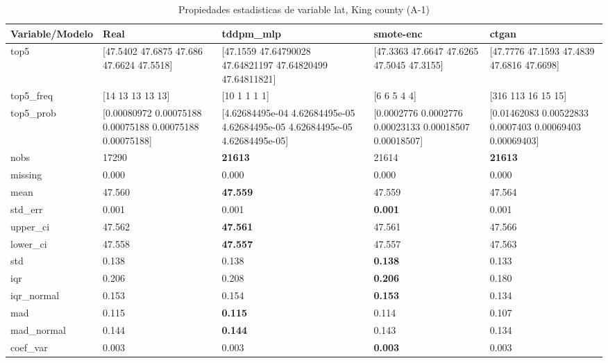 \begin{table}[H]
\centering
\fontsize{8}{14}\selectfont
\caption{Propiedades  estadisticas de variable lat, King county (A-1)}
\label{table-stats-king county-a-1-lat}
\begin{tabular}{|l|m{10em}|m{10em}|m{10em}|m{10em}|}
\hline
 \rowcolor[gray]{0.8}
Variable/Modelo & Real & tddpm\_mlp & smote-enc & ctgan \\
\hline top5 & [47.5402 47.6875 47.686  47.6624 47.5518] & [47.1559     47.64790028 47.64821197 47.64820499 47.64811821] & [47.3363 47.6647 47.6265 47.5045 47.3155] & [47.7776 47.1593 47.4839 47.6816 47.6698] \\
\hline top5\_freq & [14 13 13 13 13] & [10  1  1  1  1] & [6 6 5 4 4] & [316 113  16  15  15] \\
\hline top5\_prob & [0.00080972 0.00075188 0.00075188 0.00075188 0.00075188] & [4.62684495e-04 4.62684495e-05 4.62684495e-05 4.62684495e-05
 4.62684495e-05] & [0.0002776  0.0002776  0.00023133 0.00018507 0.00018507] & [0.01462083 0.00522833 0.0007403  0.00069403 0.00069403] \\
\hline nobs & 17290 & \bfseries 21613 & \cellcolor[rgb]{0.9, 0.54, 0.52} 21614 & \bfseries 21613 \\
\hline missing & 0.000 & 0.000 & 0.000 & 0.000 \\
\hline mean & 47.560 & \bfseries 47.559 & 47.559 & \cellcolor[rgb]{0.9, 0.54, 0.52} 47.564 \\
\hline std\_err & 0.001 & 0.001 & \bfseries 0.001 & \cellcolor[rgb]{0.9, 0.54, 0.52} 0.001 \\
\hline upper\_ci & 47.562 & \bfseries 47.561 & 47.561 & \cellcolor[rgb]{0.9, 0.54, 0.52} 47.566 \\
\hline lower\_ci & 47.558 & \bfseries 47.557 & 47.557 & \cellcolor[rgb]{0.9, 0.54, 0.52} 47.563 \\
\hline std & 0.138 & 0.138 & \bfseries 0.138 & \cellcolor[rgb]{0.9, 0.54, 0.52} 0.133 \\
\hline iqr & 0.206 & 0.208 & \bfseries 0.206 & \cellcolor[rgb]{0.9, 0.54, 0.52} 0.180 \\
\hline iqr\_normal & 0.153 & 0.154 & \bfseries 0.153 & \cellcolor[rgb]{0.9, 0.54, 0.52} 0.134 \\
\hline mad & 0.115 & \bfseries 0.115 & 0.114 & \cellcolor[rgb]{0.9, 0.54, 0.52} 0.107 \\
\hline mad\_normal & 0.144 & \bfseries 0.144 & 0.143 & \cellcolor[rgb]{0.9, 0.54, 0.52} 0.134 \\
\hline coef\_var & 0.003 & 0.003 & \bfseries 0.003 & \cellcolor[rgb]{0.9, 0.54, 0.52} 0.003 \\

\end{tabular}
\end{table}
